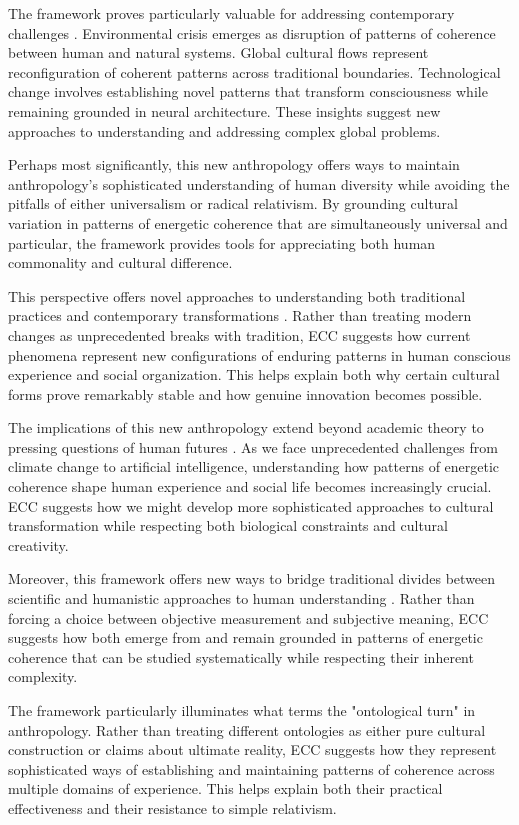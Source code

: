 \begin{refsection}
The framework proves particularly valuable for addressing contemporary challenges \cite{latour2017facing}. Environmental crisis emerges as disruption of patterns of coherence between human and natural systems. Global cultural flows represent reconfiguration of coherent patterns across traditional boundaries. Technological change involves establishing novel patterns that transform consciousness while remaining grounded in neural architecture. These insights suggest new approaches to understanding and addressing complex global problems.

Perhaps most significantly, this new anthropology offers ways to maintain anthropology's sophisticated understanding of human diversity \cite{moore2011still} while avoiding the pitfalls of either universalism or radical relativism. By grounding cultural variation in patterns of energetic coherence that are simultaneously universal and particular, the framework provides tools for appreciating both human commonality and cultural difference.

This perspective offers novel approaches to understanding both traditional practices and contemporary transformations \cite{tsing2015mushroom}. Rather than treating modern changes as unprecedented breaks with tradition, ECC suggests how current phenomena represent new configurations of enduring patterns in human conscious experience and social organization. This helps explain both why certain cultural forms prove remarkably stable and how genuine innovation becomes possible.

The implications of this new anthropology extend beyond academic theory to pressing questions of human futures \cite{haraway2016staying}. As we face unprecedented challenges from climate change to artificial intelligence, understanding how patterns of energetic coherence shape human experience and social life becomes increasingly crucial. ECC suggests how we might develop more sophisticated approaches to cultural transformation while respecting both biological constraints and cultural creativity.

Moreover, this framework offers new ways to bridge traditional divides between scientific and humanistic approaches to human understanding \cite{stengers2018another}. Rather than forcing a choice between objective measurement and subjective meaning, ECC suggests how both emerge from and remain grounded in patterns of energetic coherence that can be studied systematically while respecting their inherent complexity.

The framework particularly illuminates what \cite{bessire2014ontological} terms the "ontological turn" in anthropology. Rather than treating different ontologies as either pure cultural construction or claims about ultimate reality, ECC suggests how they represent sophisticated ways of establishing and maintaining patterns of coherence across multiple domains of experience. This helps explain both their practical effectiveness and their resistance to simple relativism.


\end{refsection}

